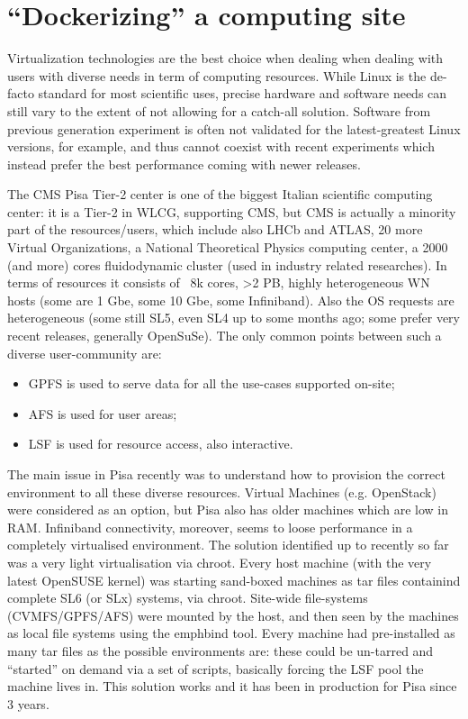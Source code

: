 \documentclass{PoS}
\begin{document}
\section{``Dockerizing'' a computing site}
Virtualization technologies are the best choice when dealing when dealing with users with diverse needs in term of computing resources. While Linux is the de-facto standard for most scientific uses, precise hardware and software needs can still vary to the extent of not allowing for a catch-all solution. Software from previous generation experiment is often not validated for the latest-greatest Linux versions, for example, and thus cannot coexist with recent experiments which instead prefer the best performance coming with newer releases.

The CMS Pisa Tier-2 center is one of the biggest Italian scientific computing center: it is a Tier-2 in WLCG, supporting CMS, but CMS is actually a minority part of the resources/users, which include also LHCb and ATLAS, 20 more Virtual Organizations, a National Theoretical Physics computing center, a 2000 (and more) cores fluidodynamic cluster (used in industry related researches). In terms of resources it consists of ~8k cores, >2 PB, highly heterogeneous WN hosts (some are 1 Gbe, some 10 Gbe, some Infiniband). Also the OS requests are heterogeneous (some still SL5, even SL4 up to some months ago; some prefer very recent releases, generally OpenSuSe). The only common points between such a diverse user-community are: 

\begin{itemize}
\item GPFS is used to serve data for all the use-cases supported on-site;
\item AFS is used for user areas; 
\item LSF is used for resource access, also interactive.
\end{itemize}

The main issue in Pisa recently was to understand how to provision the correct environment to all these diverse resources. Virtual Machines (e.g. OpenStack) were considered as an option, but
Pisa also has older machines which are low in RAM. Infiniband connectivity, moreover, seems to loose performance in a completely virtualised environment. The solution identified up to recently so far was a very light virtualisation via chroot. Every host machine (with the very latest OpenSUSE kernel) was starting sand-boxed machines as tar files containind complete SL6 (or SLx) systems,  via chroot. Site-wide file-systems (CVMFS/GPFS/AFS) were mounted by the host, and then seen by the machines as local file systems using the emph{bind}  tool.
Every machine had pre-installed as many tar files as the possible environments are: these could be un-tarred and ``started'' on demand via a set of scripts, basically forcing the LSF pool the machine lives in. This solution works and it has been in production for Pisa since 3 years.
\end{document}

